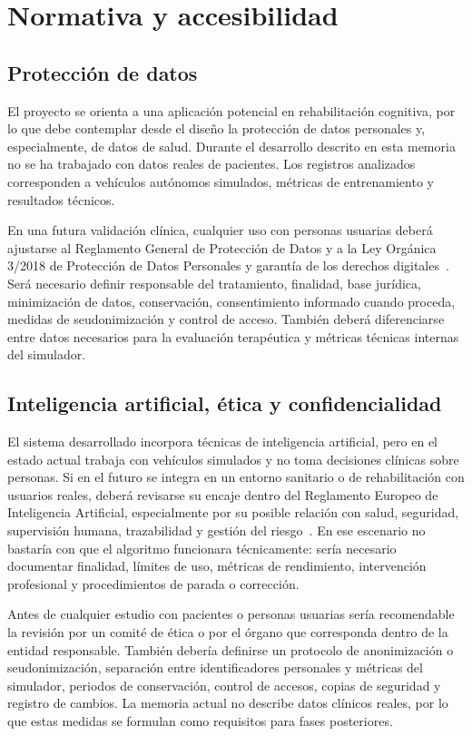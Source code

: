 \chapter{Normativa y accesibilidad}

\section{Protección de datos}

El proyecto se orienta a una aplicación potencial en rehabilitación cognitiva, por lo que debe contemplar desde el diseño la protección de datos personales y, especialmente, de datos de salud. Durante el desarrollo descrito en esta memoria no se ha trabajado con datos reales de pacientes. Los registros analizados corresponden a vehículos autónomos simulados, métricas de entrenamiento y resultados técnicos.

En una futura validación clínica, cualquier uso con personas usuarias deberá ajustarse al Reglamento General de Protección de Datos y a la Ley Orgánica 3/2018 de Protección de Datos Personales y garantía de los derechos digitales~\cite{rgpd,lopdgdd}. Será necesario definir responsable del tratamiento, finalidad, base jurídica, minimización de datos, conservación, consentimiento informado cuando proceda, medidas de seudonimización y control de acceso. También deberá diferenciarse entre datos necesarios para la evaluación terapéutica y métricas técnicas internas del simulador.

\section{Inteligencia artificial, ética y confidencialidad}

El sistema desarrollado incorpora técnicas de inteligencia artificial, pero en el estado actual trabaja con vehículos simulados y no toma decisiones clínicas sobre personas. Si en el futuro se integra en un entorno sanitario o de rehabilitación con usuarios reales, deberá revisarse su encaje dentro del Reglamento Europeo de Inteligencia Artificial, especialmente por su posible relación con salud, seguridad, supervisión humana, trazabilidad y gestión del riesgo~\cite{aiact}. En ese escenario no bastaría con que el algoritmo funcionara técnicamente: sería necesario documentar finalidad, límites de uso, métricas de rendimiento, intervención profesional y procedimientos de parada o corrección.

Antes de cualquier estudio con pacientes o personas usuarias sería recomendable la revisión por un comité de ética o por el órgano que corresponda dentro de la entidad responsable. También debería definirse un protocolo de anonimización o seudonimización, separación entre identificadores personales y métricas del simulador, periodos de conservación, control de accesos, copias de seguridad y registro de cambios. La memoria actual no describe datos clínicos reales, por lo que estas medidas se formulan como requisitos para fases posteriores.

